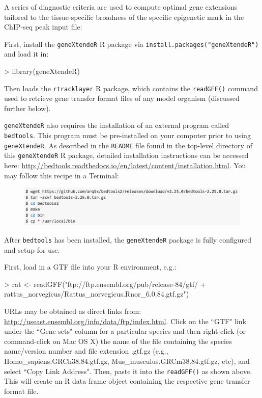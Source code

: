 \documentclass[12pt]{article}
\begin{document}
A series of diagnostic criteria are used to compute optimal gene extensions tailored to the tissue-specific broadness of the specific epigenetic mark in the ChIP-seq peak input file:

First, install the \texttt{geneXtendeR} R package via \texttt{install.packages("geneXtendeR")} and load it in:

\begin{Schunk}
\begin{Sinput}
> library(geneXtendeR)
\end{Sinput}
\end{Schunk}

Then loads the \texttt{rtracklayer} R package, which contains the \texttt{readGFF()} command used to retrieve gene transfer format files of any model organism (discussed further below).

\texttt{geneXtendeR} also requires the installation of an external program called \texttt{bedtools}.  This program must be pre-installed on your computer prior to using \texttt{geneXtendeR}.  As described in the \texttt{README} file found in the top-level directory of this \texttt{geneXtendeR} R package, detailed installation instructions can be accessed here: \url{http://bedtools.readthedocs.io/en/latest/content/installation.html}.  You may follow this recipe in a Terminal:

\begin{figure}[H]
\centering
\includegraphics{figures/bedtoolsInstallation.png}
\end{figure}

After \texttt{bedtools} has been installed, the \texttt{geneXtendeR} package is fully configured and setup for use. 

First, load in a GTF file into your R environment, e.g.:

\begin{Schunk}
\begin{Sinput}
> rat <- readGFF("ftp://ftp.ensembl.org/pub/release-84/gtf/
+                       rattus_norvegicus/Rattus_norvegicus.Rnor_6.0.84.gtf.gz")
\end{Sinput}
\end{Schunk}

URLs may be obtained as direct links from: \url{http://useast.ensembl.org/info/data/ftp/index.html}.  Click on the ``GTF" link under the ``Gene sets" column for a particular species and then right-click (or command-click on Mac OS X) the name of the file containing the species name/version number and file extension .gtf.gz (e.g., Homo\_sapiens.GRCh38.84.gtf.gz, Mus\_musculus.GRCm38.84.gtf.gz, etc), and select ``Copy Link Address".  Then, paste it into the \texttt{readGFF()} as shown above.  This will create an R data frame object containing the respective gene transfer format file.
\end{document}
